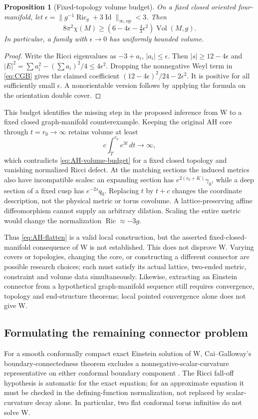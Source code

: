 \documentclass[a4paper,11pt]{article}
\numberwithin{equation}{section}
\newtheorem{proposition}[theorem]{Proposition}
\theoremstyle{definition}
\newcommand{\Ric}{\operatorname{Ric}}
\newcommand{\Vol}{\operatorname{Vol}}
\newcommand{\Id}{\operatorname{Id}}
\newcommand{\op}{\mathrm{op}}
\begin{document}
\begin{proposition}[Fixed-topology volume budget]\label{prop:AH-volume-budget}
On a fixed closed oriented four-manifold, let $\epsilon=\|g^{-1}\Ric_g+3\Id\|_{\infty,\op}<3$. Then
\begin{equation}\label{eq:AH-volume-budget}
 8\pi^2\chi(M)\ge
 \left(6-4\epsilon-\tfrac43\epsilon^2\right)\Vol(M,g).
\end{equation}
In particular, a family with $\epsilon\to0$ has uniformly bounded volume.
\end{proposition}
\begin{proof}
Write the Ricci eigenvalues as $-3+a_i$, $|a_i|\le\epsilon$. Then
$|s|\ge12-4\epsilon$ and
$|E|^2=\sum a_i^2-(\sum a_i)^2/4\le4\epsilon^2$.
Dropping the nonnegative Weyl term in \eqref{eq:CGB} gives the claimed coefficient
$(12-4\epsilon)^2/24-2\epsilon^2$. It is positive for all sufficiently small $\epsilon$. A nonorientable version follows by applying the formula on the orientation double cover.
\end{proof}

This budget identifies the missing step in the proposed inference from W to a fixed closed graph-manifold counterexample. Keeping the original AH core through $t=r_0\to\infty$ retains volume at least
\[
 c\int_T^{r_0}e^{3t}\,dt\longrightarrow\infty,
\]
which contradicts \eqref{eq:AH-volume-budget} for a fixed closed topology and vanishing normalized Ricci defect. At the matching sections the induced metrics also have incompatible scales: an expanding section has $e^{2(r_0+K)}\gamma_0$, while a deep section of a fixed cusp has $e^{-2s}q_0$. Replacing $t$ by $t+c$ changes the coordinate description, not the physical metric or torus covolume. A lattice-preserving affine diffeomorphism cannot supply an arbitrary dilation. Scaling the entire metric would change the normalization $\Ric\approx-3g$.

Thus \eqref{eq:AH-flatten} is a valid local construction, but the asserted fixed-closed-manifold consequence of W is not established. This does not disprove W. Varying covers or topologies, changing the core, or constructing a different connector are possible research choices; each must satisfy its actual lattice, two-ended metric, constraint and volume data simultaneously. Likewise, extracting an Einstein connector from a hypothetical graph-manifold sequence still requires convergence, topology and end-structure theorems; local pointed convergence alone does not give W.

\subsection{Formulating the remaining connector problem}\label{sec:connector-continuation}
For a smooth conformally compact exact Einstein solution of W, Cai--Galloway's boundary-connectedness theorem excludes a nonnegative-scalar-curvature representative on either conformal boundary component \cite[Theorem 1]{CaiGalloway}. The Ricci fall-off hypothesis is automatic for the exact equation; for an approximate equation it must be checked in the defining-function normalization, not replaced by scalar-curvature decay alone. In particular, two flat conformal torus infinities do not solve W.
\end{document}
